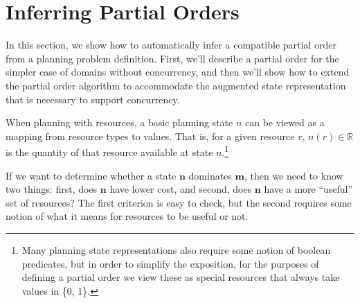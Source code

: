 \documentclass[letterpaper]{article}
\theoremstyle{plain} \newtheorem{theorem}{Theorem} \newtheorem{proposition}{Proposition} \newtheorem{lemma}{Lemma}
\theoremstyle{definition} \newtheorem{definition}{Definition} \newtheorem{conjecture}{Conjecture} \newtheorem*{example}{Example}
\theoremstyle{remark} \newtheorem*{remark}{Remark} \newtheorem*{note}{Note} \newtheorem{case}{Case}
\newcommand{\R}{\mathbb{R}}
\begin{document}
\section{Inferring Partial Orders}

\newcommand{\po}{\preceq_R}

In this section, we show how to automatically infer a compatible partial order from a
planning problem definition. First, we'll describe a partial order for the simpler case of
domains without concurrency, and then we'll show how to extend the partial order algorithm
to accommodate the augmented state representation that is necessary to support concurrency.

When planning with resources, a basic planning state $n$ can be viewed as a mapping from
resource types to values. That is, for a given resource $r$, $n(r) \in \R$ is the quantity
of that resource available at state $n$.\footnote{Many planning state representations also
require some notion of boolean predicates, but in order to simplify the exposition, for the
purposes of defining a partial order we view these as special resources that always take
values in \{0, 1\}.}

If we want to determine whether a state $\mathbf{n}$ dominates $\mathbf{m}$, then we need
to know two things: first, does $\mathbf{n}$ have lower cost, and second, does $\mathbf{n}$
have a more ``useful'' set of resources? The first criterion is easy to check, but the
second requires some notion of what it means for resources to be useful or not.
\end{document}
